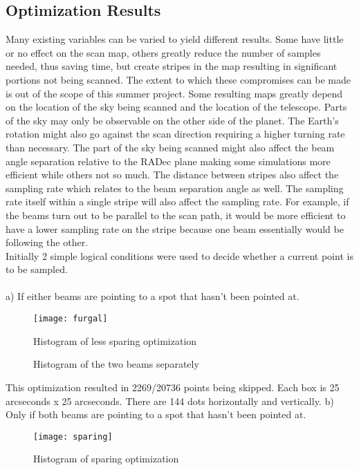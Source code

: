 \documentclass{article}%
\begin{document}
\subsection{Optimization Results}
Many existing variables can be varied to yield different results. Some have little or no effect on the scan map, others greatly reduce the number of samples needed, thus saving time, but create stripes in the map resulting in significant portions not being scanned. The extent  to which  these compromises can be made is out of the scope of this summer project. Some resulting maps greatly depend on the location of the sky being scanned and the location of the telescope. Parts of the sky may only be observable on the other side of the planet. The Earth's rotation might also go against the scan direction requiring a higher turning rate than necessary. The part of the sky being scanned might also affect the beam angle separation relative to the RADec plane making some simulations more efficient while others not so much.  The distance between stripes also affect the sampling rate which relates to the beam separation angle as well. The sampling rate itself within a single stripe will also affect the sampling rate. For example, if the beams turn out to be parallel to the scan path, it would be more efficient to have a lower sampling rate on the stripe because one beam essentially would be following the other.\\
\newpage
Initially 2 simple logical conditions were used to decide whether a current point is to be sampled.\\\\
a) If either beams are pointing to a spot that hasn't been pointed at.\\

\begin{figure}[h!]
 \centering
\texttt{[image: furgal]}
\caption{Histogram of less sparing optimization}
\end{figure}

\begin{figure}[h!]
    \centering
    \qquad
    \caption{Histogram of the two beams separately}
\end{figure}
This optimization resulted in  2269/20736 points being skipped. Each box is 25 arcseconds x  25 arcseconds. There are 144 dots
horizontally and vertically.
\newpage
b) Only if both beams are pointing to a spot that hasn't been pointed at.\\
\begin{figure}[h!]
 \centering
\texttt{[image: sparing]}
\caption{Histogram of sparing optimization}
\end{figure}
\end{document}
